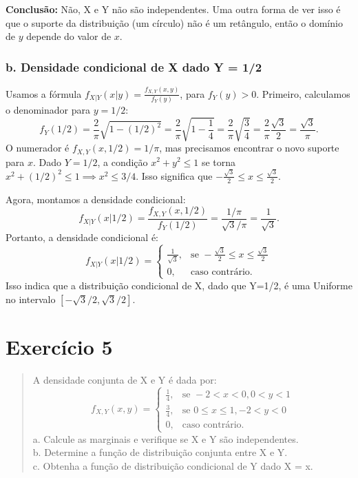 \documentclass[12pt]{article}
\begin{document}
\textbf{Conclusão:} Não, X e Y não são independentes. Uma outra forma de ver isso é que o suporte da distribuição (um círculo) não é um retângulo, então o domínio de $y$ depende do valor de $x$.

\subsubsection*{b. Densidade condicional de X dado Y = 1/2}
Usamos a fórmula $f_{X|Y}(x|y) = \frac{f_{X,Y}(x,y)}{f_Y(y)}$, para $f_Y(y)>0$.
Primeiro, calculamos o denominador para $y=1/2$:
\[ f_Y(1/2) = \frac{2}{\pi}\sqrt{1-(1/2)^2} = \frac{2}{\pi}\sqrt{1-\frac{1}{4}} = \frac{2}{\pi}\sqrt{\frac{3}{4}} = \frac{2}{\pi}\frac{\sqrt{3}}{2} = \frac{\sqrt{3}}{\pi}. \]
O numerador é $f_{X,Y}(x, 1/2) = 1/\pi$, mas precisamos encontrar o novo suporte para $x$.
Dado $Y=1/2$, a condição $x^2+y^2 \le 1$ se torna $x^2 + (1/2)^2 \le 1 \implies x^2 \le 3/4$.
Isso significa que $-\frac{\sqrt{3}}{2} \le x \le \frac{\sqrt{3}}{2}$.

Agora, montamos a densidade condicional:
\[ f_{X|Y}(x | 1/2) = \frac{f_{X,Y}(x, 1/2)}{f_Y(1/2)} = \frac{1/\pi}{\sqrt{3}/\pi} = \frac{1}{\sqrt{3}}. \]
Portanto, a densidade condicional é:
\[ f_{X|Y}(x | 1/2) = \begin{cases} \frac{1}{\sqrt{3}}, & \text{se } -\frac{\sqrt{3}}{2} \le x \le \frac{\sqrt{3}}{2} \\ 0, & \text{caso contrário.} \end{cases} \]
Isso indica que a distribuição condicional de X, dado que Y=1/2, é uma Uniforme no intervalo $[-\sqrt{3}/2, \sqrt{3}/2]$.

\pagebreak

\section{Exercício 5}

\begin{quote}
A densidade conjunta de X e Y é dada por:
\[ f_{X,Y}(x,y) = \begin{cases} \frac{1}{4}, & \text{se } -2 < x < 0, 0 < y < 1 \\ \frac{3}{4}, & \text{se } 0 \le x \le 1, -2 < y < 0 \\ 0, & \text{caso contrário.} \end{cases} \]
a. Calcule as marginais e verifique se X e Y são independentes. \\
b. Determine a função de distribuição conjunta entre X e Y. \\
c. Obtenha a função de distribuição condicional de Y dado X = x.
\end{quote}
\end{document}
